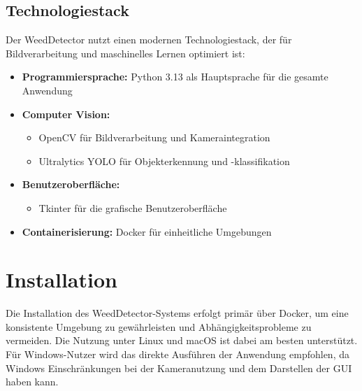 \documentclass[12pt, a4paper]{scrreprt}
\begin{document}
\section{Technologiestack}
Der WeedDetector nutzt einen modernen Technologiestack, der für Bildverarbeitung und maschinelles Lernen optimiert ist:

\begin{itemize}
    \item \textbf{Programmiersprache:} Python 3.13 als Hauptsprache für die gesamte Anwendung
    \item \textbf{Computer Vision:}
    \begin{itemize}
        \item OpenCV für Bildverarbeitung und Kameraintegration
        \item Ultralytics YOLO für Objekterkennung und -klassifikation
    \end{itemize}
    \item \textbf{Benutzeroberfläche:}
    \begin{itemize}
        \item Tkinter für die grafische Benutzeroberfläche
    \end{itemize}
    \item \textbf{Containerisierung:} Docker für einheitliche Umgebungen
\end{itemize}

\chapter{Installation}
Die Installation des WeedDetector-Systems erfolgt primär über Docker, um eine konsistente Umgebung zu gewährleisten und Abhängigkeitsprobleme zu vermeiden.
Die Nutzung unter Linux und macOS ist dabei am besten unterstützt. Für Windows-Nutzer wird das direkte Ausführen der Anwendung empfohlen, da Windows Einschränkungen bei der Kameranutzung und dem Darstellen der GUI haben kann.
\end{document}
